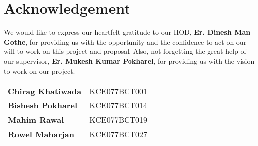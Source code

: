 






	
		 \large
            \chapter*{Acknowledgement}
            \normalsize
            
            We would like to express our heartfelt gratitude to our HOD, \textbf{Er. Dinesh Man Gothe}, for providing us with the opportunity and the confidence to act on our will to work on this project and proposal. Also, not forgetting the great help of our supervisor, \textbf{Er. Mukesh Kumar Pokharel}, for providing us with the vision to work on our project.


            \vspace{1 cm}


            \begin{tabular}{ll}
                \centering
                \textbf{Chirag Khatiwada} & KCE077BCT001 \\
                \textbf{Bishesh Pokharel} & KCE077BCT014 \\
                \textbf{Mahim Rawal} & KCE077BCT019 \\
                \textbf{Rowel Maharjan} & KCE077BCT027 \\
            \end{tabular}

                   

   
		\break
		
		\large
